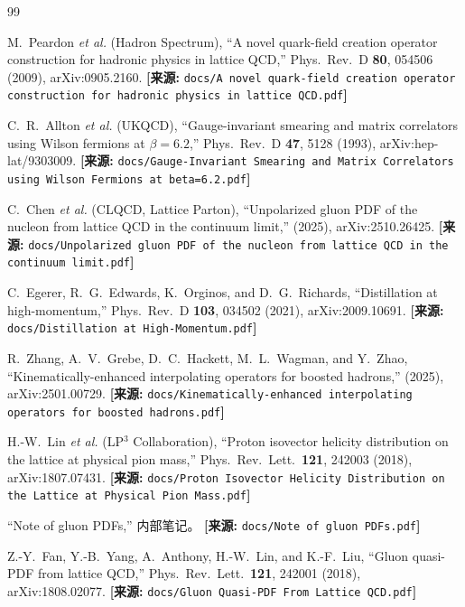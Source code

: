 \documentclass[12pt,a4paper]{ctexart}
\theoremstyle{definition}
\begin{document}
\begin{thebibliography}{99}

M.~Peardon \textit{et al.} (Hadron Spectrum),
``A novel quark-field creation operator construction for hadronic physics in lattice QCD,''
Phys.\ Rev.\ D \textbf{80}, 054506 (2009), arXiv:0905.2160.
\quad\textbf{[来源:} \texttt{docs/A novel quark-field creation operator construction for hadronic physics in lattice QCD.pdf}\textbf{]}

C.~R.~Allton \textit{et al.} (UKQCD),
``Gauge-invariant smearing and matrix correlators using Wilson fermions at $\beta=6.2$,''
Phys.\ Rev.\ D \textbf{47}, 5128 (1993), arXiv:hep-lat/9303009.
\quad\textbf{[来源:} \texttt{docs/Gauge-Invariant Smearing and Matrix Correlators using Wilson Fermions at beta=6.2.pdf}\textbf{]}

C.~Chen \textit{et al.} (CLQCD, Lattice Parton),
``Unpolarized gluon PDF of the nucleon from lattice QCD in the continuum limit,''
(2025), arXiv:2510.26425.
\quad\textbf{[来源:} \texttt{docs/Unpolarized gluon PDF of the nucleon from lattice QCD in the continuum limit.pdf}\textbf{]}

C.~Egerer, R.~G.~Edwards, K.~Orginos, and D.~G.~Richards,
``Distillation at high-momentum,''
Phys.\ Rev.\ D \textbf{103}, 034502 (2021), arXiv:2009.10691.
\quad\textbf{[来源:} \texttt{docs/Distillation at High-Momentum.pdf}\textbf{]}

R.~Zhang, A.~V.~Grebe, D.~C.~Hackett, M.~L.~Wagman, and Y.~Zhao,
``Kinematically-enhanced interpolating operators for boosted hadrons,''
(2025), arXiv:2501.00729.
\quad\textbf{[来源:} \texttt{docs/Kinematically-enhanced interpolating operators for boosted hadrons.pdf}\textbf{]}

H.-W.~Lin \textit{et al.} (LP$^3$ Collaboration),
``Proton isovector helicity distribution on the lattice at physical pion mass,''
Phys.\ Rev.\ Lett.\ \textbf{121}, 242003 (2018), arXiv:1807.07431.
\quad\textbf{[来源:} \texttt{docs/Proton Isovector Helicity Distribution on the Lattice at Physical Pion Mass.pdf}\textbf{]}

``Note of gluon PDFs,''
内部笔记。
\quad\textbf{[来源:} \texttt{docs/Note of gluon PDFs.pdf}\textbf{]}

Z.-Y.~Fan, Y.-B.~Yang, A.~Anthony, H.-W.~Lin, and K.-F.~Liu,
``Gluon quasi-PDF from lattice QCD,''
Phys.\ Rev.\ Lett.\ \textbf{121}, 242001 (2018), arXiv:1808.02077.
\quad\textbf{[来源:} \texttt{docs/Gluon Quasi-PDF From Lattice QCD.pdf}\textbf{]}


\end{thebibliography}
\end{document}
